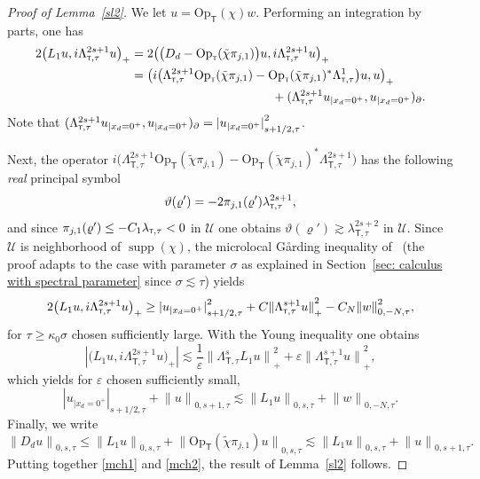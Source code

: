 \documentclass[JEP,XML,SOM,Unicode,published]{cedram}
\theoremstyle{plain}
\theoremstyle{definition}
\newcommand{\nhd}{neighborhood\xspace}
\newcommand{\suff}{sufficiently\xspace}
\let\k\kappa
\let\y\varrho
\newcommand{\tchi}{\tilde{\chi}}
\let \Re \relax
\DeclareMathOperator{\Re}{Re}
\let \Im \relax
\DeclareMathOperator{\Im}{Im}
\newcommand{\inp}[2]{(#1, #2)}
\newcommand{\biginp}[2]{\big(#1, #2 \big)}
\newcommand{\U}{\mathscr U}
\newcommand{\br}{\ensuremath{_{|x_d=0^+}}}
\newcommand{\Opt}{\ensuremath{\mathrm{Op}_{\scriptscriptstyle{\mathsf{T}}}}}
\newcommand{\Norm}[2]{{\| #1 \|}_{#2}}
\newcommand{\Normsc}[2]{{\| #1 \|}_{#2, \tau}}
\newcommand{\normsc}[2]{{| #1 |}_{#2, \tau}}
\newcommand{\lsct}{\lambda_{{\scriptscriptstyle{\mathsf T}},\tau}}
\newcommand{\Lsct}{\Lambda_{{\scriptscriptstyle{\mathsf T}},\tau}}
\DeclareMathOperator{\supp}{supp}
\begin{document}
\begin{proof}[Proof of Lemma~\ref{sl2}]
We let $u=\Opt(\chi)w$. Performing an integration by parts, one has
\begin{align*}
2\Re\biginp{L_1 u}{i\Lsct^{2s+1} u}_+
& = 2\Re\biginp{ \big(D_d-\Opt(\tchi\pi_{j,1})\big)u} {i\Lsct^{2s+1} u}_+\\
&= \Re \biginp{i
\big(\Lsct^{2s+1}\Opt(\tchi\pi_{j,1})-\Opt(\tchi\pi_{j,1})^*\Lsct^1\big)u
}{u}_+\\
&\hspace*{4cm} + \Re\inp{\Lsct^{2s+1}u\br}{u\br}_{\partial}.
\end{align*}
Note that
$\Re\inp{\Lsct^{2s+1}u\br}{u\br}_{\partial}
= \normsc{u\br}{s+1/2}^2$.

Next, the operator
$i \big(\Lsct^{2s+1}\Opt(\tchi\pi_{j,1})-\Opt(\tchi\pi_{j,1})^*\Lsct^{2s+1}\big) $
has the following \emph{real} principal symbol
\begin{equation*}
\vartheta(\y')=-2\Im\pi_{j,1}(\y')\lsct^{2s+1},
\end{equation*}
and since $\Im\pi_{j,1}(\y') \leq - C_1 \lsct <0$ in $\U$ one obtains
$\vartheta(\y')\gtrsim\lsct^{2s+2}$ in $\U$. Since~$\U$ is \nhd of
$\supp(\chi)$, the microlocal G{\aa}rding inequality of~\cite[Th.\,2.49]{JGL-vol1} (the proof adapts to the case with parameter $\sigma$ as
explained in Section~\ref{sec: calculus with spectral parameter} since $\sigma
\lesssim \tau$) yields
\begin{equation*}
2\Re\biginp{L_1 u}{i\Lsct^{2s+1} u}_+
\geq \normsc{u\br}{s+1/2}^2
+C\Norm{\Lsct^{s+1}u}{+}^2
-C_N\Normsc{w}{0,-N}^2,
\end{equation*}
for $\tau\geq \k_0\sigma$ chosen \suff
large.
With the Young inequality one obtains
\begin{equation*}
|\biginp{L_1 u}{i\Lsct^{2s+1} u}_+|
\lesssim \frac{1}{\varepsilon} \Norm{\Lsct^s L_1 u}{+}^2
+\varepsilon
\Norm{\Lsct^{s+1} u}{+}^2,
\end{equation*}
which yields for $\varepsilon$ chosen \suff small,
\begin{equation}\label{mch1}
\normsc{u\br}{s+1/2}
+\Normsc{u}{0,s+1}
\lesssim \Normsc{ L_1 u}{0,s} +\Normsc{w}{0,-N}.
\end{equation}
Finally, we write
\begin{equation}\label{mch2}
\Normsc{D_du}{0,s} \leq
\Normsc{L_1 u}{0,s} + \Normsc{\Opt(\tchi \pi_{j,1}) u}{0,s}
\lesssim
\Normsc{L_1 u}{0,s} + \Normsc{u}{0,s+1}.
\end{equation}
Putting together \eqref{mch1} and \eqref{mch2}, the result of
Lemma~\ref{sl2} follows.
\end{proof}
\end{document}
